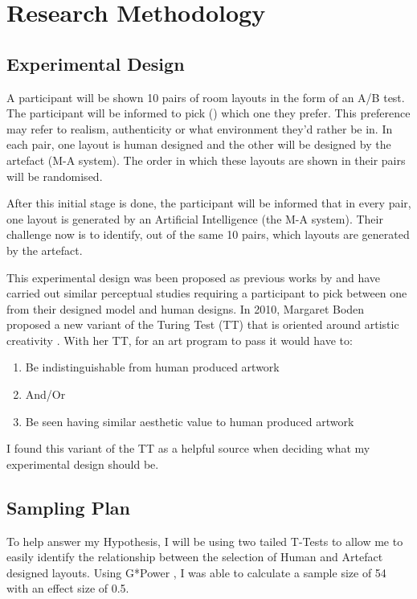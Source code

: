 \section{Research Methodology}

\subsection{Experimental Design}
A participant will be shown 10 pairs of room layouts in the form of an A/B test. The participant will be informed to pick () which one they prefer.
This preference may refer to realism, authenticity or what environment they'd rather be in. In each pair, one layout is human designed and the other will be designed by the artefact (M-A system). The order in which these layouts are shown in their pairs will be randomised.

After this initial stage is done, the participant will be informed that in every pair, one layout is generated by an Artificial Intelligence (the M-A system). Their challenge now is to identify, out of the same 10 pairs, which layouts are generated by the artefact.

This experimental design was been proposed as previous works by  \cite{constrained-layouts} and  \cite{make-it-home} have carried out similar perceptual studies requiring a participant to pick between one from their designed model and human designs. In 2010, Margaret Boden proposed a new variant of the Turing Test (TT) that is oriented around artistic creativity \cite{artistic-tt}. With her TT, for an art program to pass it would have to:
\begin{enumerate}
    \item Be indistinguishable from human produced artwork
    \item[]And/Or
    \item Be seen having similar aesthetic value to human produced artwork
\end{enumerate}
I found this variant of the TT as a helpful source when deciding what my experimental design should be.

\subsection{Sampling Plan}
To help answer my Hypothesis, I will be using two tailed T-Tests to allow me to easily identify the relationship between the selection of Human and Artefact designed layouts.
Using G*Power \cite{gpower}, I was able to calculate a sample size of 54 with an effect size of 0.5. 

